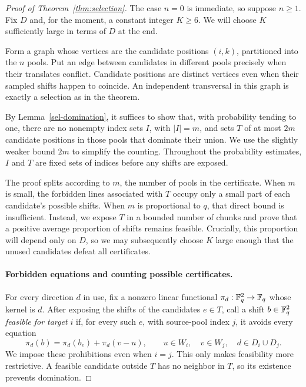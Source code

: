 \begin{proof}[Proof of Theorem~\ref{thm:selection}]
The case $n=0$ is immediate, so suppose $n\ge1$.  Fix $D$ and, for the
moment, a constant integer $K\ge6$.  We will choose $K$ sufficiently
large in terms of $D$ at the end.

Form a graph whose vertices are the candidate positions $(i,k)$,
partitioned into the $n$ pools.  Put an edge between candidates in
different pools precisely when their translates conflict.  Candidate
positions are distinct vertices even when their sampled shifts happen
to coincide.  An independent transversal in this graph is exactly a
selection as in the theorem.

By Lemma~\ref{sel-domination}, it suffices to show that, with probability
tending to one, there are no nonempty index sets $I$, with $|I|=m$, and
sets $T$ of at most $2m$ candidate positions in those pools that dominate
their union.  We use the slightly weaker bound $2m$ to simplify the
counting.  Throughout the probability estimates, $I$ and $T$ are fixed
sets of indices before any shifts are exposed.

The proof splits according to $m$, the number of pools in the
certificate. When $m$ is small, the forbidden lines associated with
$T$ occupy only a small part of each candidate's possible shifts.
When $m$ is proportional to $q$, that direct bound is insufficient.
Instead, we expose $T$ in a bounded number of chunks and prove that
a positive average proportion of shifts remains feasible. Crucially,
this proportion will depend only on $D$, so we may subsequently choose
$K$ large enough that the unused candidates defeat all certificates.

\paragraph{Forbidden equations and counting possible certificates.}
For every direction $d$ in use, fix a nonzero linear functional
$\pi_d:\mathbb F_q^2\to\mathbb F_q$ whose kernel is $d$.  After exposing the shifts
of the candidates $e\in T$, call a shift $b\in\mathbb F_q^2$ \emph{feasible
for target $i$} if, for every such $e$, with source-pool index $j$, it
avoids every equation
\begin{equation}\label{sel-forbidden}
 \pi_d(b)=\pi_d(b_e)+\pi_d(v-u),
 \qquad
 u\in W_i,\quad v\in W_j,\quad d\in D_i\cup D_j.
\end{equation}
We impose these prohibitions even when $i=j$.  This only makes
feasibility more restrictive.  A feasible candidate outside $T$ has no
neighbor in $T$, so its existence prevents domination.


\end{proof}
